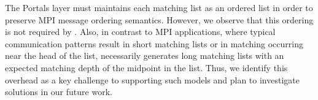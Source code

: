 The Portals layer must maintains each matching list as an ordered list in order
to preserve MPI message ordering semantics.  However, we observe that this
ordering is not required by \pdht.  Also, in contrast to MPI applications,
where typical communication patterns result in short matching lists or in
matching occurring near the head of the list, \pdht necessarily generates long
matching lists with an expected matching depth of the midpoint in the list.
Thus, we identify this overhead as a key challenge to supporting such models
and plan to investigate solutions in our future work.


